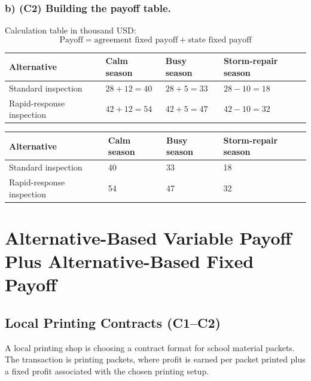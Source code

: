 	\subsubsection*{b) \textbf{(C2)} Building the payoff table.}
	\label{subsec:problem10-harbor-inspection-agreements-c2}
	Calculation table in thousand USD:
	\[
	\text{Payoff}=\text{agreement fixed payoff}+\text{state fixed payoff}
	\]
	\begin{center}
		\begin{tabular}{llll}
			\toprule
			Alternative & Calm season & Busy season & Storm-repair season \\
			\midrule
			Standard inspection & $28 + 12 = 40$ & $28 + 5 = 33$ & $28 - 10 = 18$ \\
			Rapid-response inspection & $42 + 12 = 54$ & $42 + 5 = 47$ & $42 - 10 = 32$ \\
			\bottomrule
		\end{tabular}
	\end{center}
	
	\begin{center}
		\begin{tabular}{llll}
			\toprule
			Alternative & Calm season & Busy season & Storm-repair season \\
			\midrule
			Standard inspection & 40 & 33 & 18 \\
			Rapid-response inspection & 54 & 47 & 32 \\
			\bottomrule
		\end{tabular}
	\end{center}
	
	
	\section{Alternative-Based Variable Payoff Plus Alternative-Based Fixed Payoff}
	\label{sec:alternative-based-variable-payoff-plus-alternative-based-fixed-payoff}
	
	
	\subsection{Local Printing Contracts (C1--C2)}
	\label{sec:problem18-local-printing-contracts-c1-c2}
	A local printing shop is choosing a contract format for school material packets. The transaction is printing packets, where profit is earned per packet printed plus a fixed profit associated with the chosen printing setup.
	
